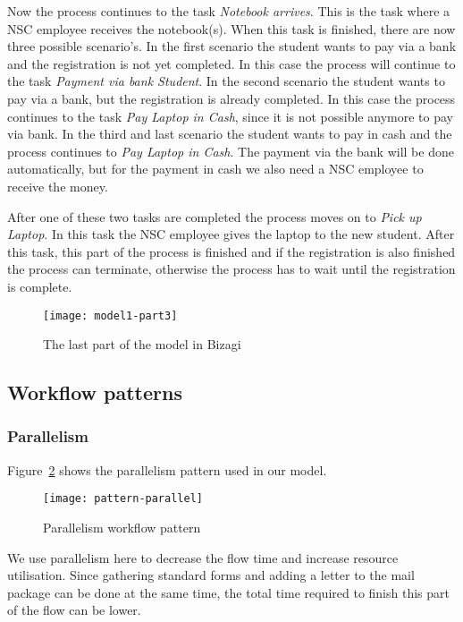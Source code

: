 Now the process continues to the task \emph{Notebook arrives}.
This is the task where a NSC employee receives the notebook(s).
When this task is finished, there are now three possible scenario's.
In the first scenario the student wants to pay via a bank and the registration is not yet completed.
In this case the process will continue to the task \emph{Payment via bank Student}.
In the second scenario the student wants to pay via a bank, but the registration is already completed.
In this case the process continues to the task \emph{Pay Laptop in Cash}, since it is not possible anymore to pay via bank.
In the third and last scenario the student wants to pay in cash and the process continues to \emph{Pay Laptop in Cash}.
The payment via the bank will be done automatically, but for the payment in cash we also need a NSC employee to receive the money.

After one of these two tasks are completed the process moves on to \emph{Pick up Laptop}.
In this task the NSC employee gives the laptop to the new student.
After this task, this part of the process is finished and if the registration is also finished the process can terminate, otherwise the process has to wait until the registration is complete.

\begin{figure}[H]
	\centering
	\texttt{[image: model1-part3]}
	\caption{The last part of the model in Bizagi}
	\label{fig:model1-part3}
\end{figure}

\subsection{Workflow patterns}

\subsubsection{Parallelism}

	Figure~\ref{fig:patterns:parallelism} shows the parallelism pattern used in our model.

	\begin{figure}[H]
		\centering
		\texttt{[image: pattern-parallel]}
		\caption{Parallelism workflow pattern}
		\label{fig:patterns:parallelism}
	\end{figure}

	We use parallelism here to decrease the flow time and increase resource utilisation.
	Since gathering standard forms and adding a letter to the mail package can be done at the same time, the total time required to finish this part of the flow can be lower.

